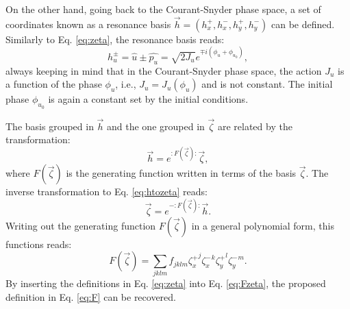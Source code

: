 On the other hand, going back to the Courant-Snyder phase space, a set of coordinates known as a resonance basis $\vec{h} = \left( h_x^+ , h_x^-, h_y^+, h_y^-\right)$ can be defined. Similarly to Eq. \ref{eq:zeta}, the resonance basis reads:
\begin{equation}
    \label{eq:hbasis}
    h_u^{\pm}=\hat{u}\pm \hat{p_u}=\sqrt{2J_u}e^{\mp i\left( \phi_u + \phi_{u_0}\right)},
\end{equation}
always keeping in mind that in the Courant-Snyder phase space, the action $J_u$ is a function of the phase $\phi_u$, i.e., $J_u = J_u(\phi_u)$ and is not constant. The initial phase $\phi_{u_0}$ is again a constant set by the initial conditions. 

The basis grouped in $\vec{h}$ and the one grouped in $\vec{\zeta}$ are related by the transformation:
\begin{equation}
    \label{eq:htozeta}
    \vec{h}=e^{:F \left(\vec{\zeta}\right):}\vec{\zeta},
\end{equation}
where $F(\vec{\zeta})$ is the generating function written in terms of the basis $\vec{\zeta}$. The inverse transformation to Eq. \ref{eq:htozeta} reads:
\begin{equation}
    \label{eq:zetatoh}
    \vec{\zeta}=e^{-:F\left( \vec{\zeta} \right):}\vec{h}.
\end{equation}
Writing out the generating function $F(\vec{\zeta})$ in a general polynomial form, this functions reads:
\begin{equation}
    \label{eq:Fzeta}
    F\left( \vec{\zeta} \right)=\sum_{jklm} f_{jklm} {\zeta_x^{+}}^{j} {\zeta_x^{-}}^k {\zeta_y^{+}}^l {\zeta_y^{-}}^m.
\end{equation}
By inserting the definitions in Eq. \ref{eq:zeta} into Eq. \ref{eq:Fzeta}, the proposed definition in Eq. \ref{eq:F} can be recovered.

